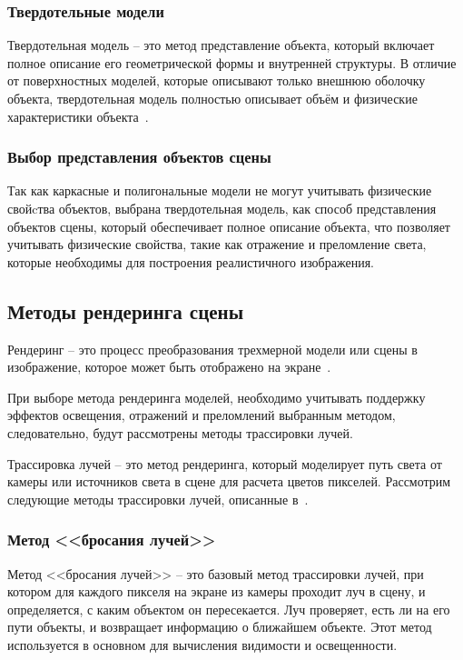 \subsubsection{Твердотельные модели}

Твердотельная модель --  это метод представление объекта, который включает полное описание его геометрической формы и внутренней структуры. В отличие от поверхностных моделей, которые описывают только внешнюю оболочку объекта, твердотельная модель полностью описывает объём и физические характеристики объекта~\cite{shapiro2001solid}.

\subsubsection*{Выбор представления объектов сцены}

Так как каркасные и полигональные модели не могут учитывать физические свойcтва объектов, выбрана твердотельная модель, как способ представления объектов сцены, который обеспечивает полное описание объекта, что позволяет учитывать физические свойства, такие как отражение и преломление света, которые необходимы для построения реалистичного изображения.

\subsection{Методы рендеринга сцены}

Рендеринг -- это процесс преобразования трехмерной модели или сцены в изображение, которое может быть отображено на экране~\cite[C.~11--12]{moller2018real}.

При выборе метода рендеринга моделей, необходимо учитывать поддержку эффектов освещения, отражений и преломлений выбранным методом, следовательно, будут рассмотрены методы трассировки лучей.

Трассировка лучей -- это метод рендеринга, который моделирует путь света от камеры или источников света в сцене для расчета цветов пикселей. Рассмотрим следующие методы трассировки лучей, описанные в~\cite[C.~443--446]{moller2018real}.

\subsubsection{Метод <<бросания лучей>>}

Метод <<бросания лучей>> -- это базовый метод трассировки лучей, при котором для каждого пикселя на экране из камеры проходит луч в сцену, и определяется, с каким объектом он пересекается. Луч проверяет, есть ли на его пути объекты, и возвращает информацию о ближайшем объекте. Этот метод используется в основном для вычисления видимости и освещенности.

